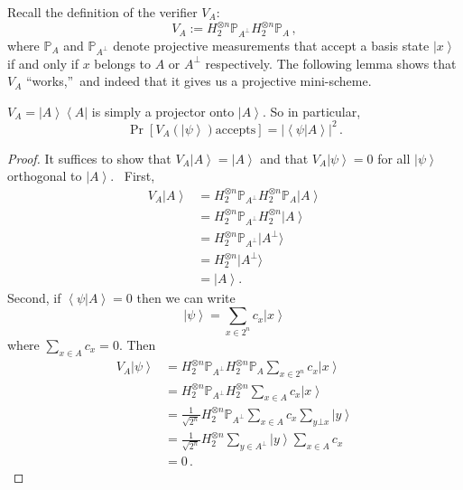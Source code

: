 Recall the definition of the verifier $V_{A}$:%
\[
V_{A}:=H_{2}^{\otimes n}\mathbb{P}_{A^{\bot}}H_{2}^{\otimes n}\mathbb{P}_{A}\,,
\]
where $\mathbb{P}_{A}$ and $\mathbb{P}_{A^{\bot}}$ denote projective
measurements that accept a basis state $\left\vert x\right\rangle $ if and
only if $x$ belongs to $A$ or $A^{\bot}$ respectively. The following lemma
shows that $V_{A}$ \textquotedblleft works,\textquotedblright\ and indeed that
it gives us a projective mini-scheme.

\begin{lemma}
\label{testworks}$V_{A}=\left\vert A\right\rangle \left\langle A\right\vert $
is simply a projector onto $\left\vert A\right\rangle $. So in particular,
\[
\Pr\left[  V_{A}\left(  \left\vert \psi\right\rangle \right)  \text{
accepts}\right]  =\left\vert \left\langle \psi|A\right\rangle \right\vert
^{2}\,.
\]
\end{lemma}

\begin{proof}
It suffices to show that $V_{A}\left\vert A\right\rangle =\left\vert
A\right\rangle $ and that $V_{A}\left\vert \psi\right\rangle =0$ for all
$\left\vert \psi\right\rangle $ orthogonal to $\left\vert A\right\rangle $.
\ First,%
\begin{align*}
V_{A}\left\vert A\right\rangle  &  =H_{2}^{\otimes n}\mathbb{P}_{A^{\bot}%
}H_{2}^{\otimes n}\mathbb{P}_{A}\left\vert A\right\rangle \\
&  =H_{2}^{\otimes n}\mathbb{P}_{A^{\bot}}H_{2}^{\otimes n}\left\vert
A\right\rangle \\
&  =H_{2}^{\otimes n}\mathbb{P}_{A^{\bot}}|A^{\bot}\rangle\\
&  =H_{2}^{\otimes n}|A^{\bot}\rangle\\
&  =\left\vert A\right\rangle .
\end{align*}
Second, if $\left\langle \psi|A\right\rangle =0$ then we can write%
\[
\left\vert \psi\right\rangle =\sum_{x\in2^{n}}{c_{x}\left\vert x\right\rangle
}%
\]
where $\sum_{x\in A}c_{x}=0$. Then%
\begin{align*}
V_{A}\left\vert \psi\right\rangle  &  =H_{2}^{\otimes n}\mathbb{P}_{A^{\bot}%
}H_{2}^{\otimes n}\mathbb{P}_{A}\sum_{x\in2^{n}}{c_{x}\left\vert
x\right\rangle }\\
&  =H_{2}^{\otimes n}\mathbb{P}_{A^{\bot}}H_{2}^{\otimes n}\sum_{x\in A}%
{c_{x}\left\vert x\right\rangle }\\
&  =\frac{1}{\sqrt{2^{n}}}H_{2}^{\otimes n}\mathbb{P}_{A^{\bot}}\sum_{x\in
A}{c_{x}\sum_{y\bot x}\left\vert y\right\rangle }\\
&  =\frac{1}{\sqrt{2^{n}}}H_{2}^{\otimes n}\sum_{y\in A^{\perp}}{\left\vert
y\right\rangle \sum_{x\in A}c_{x}}\\
&  =0\,.
\end{align*}

\end{proof}

